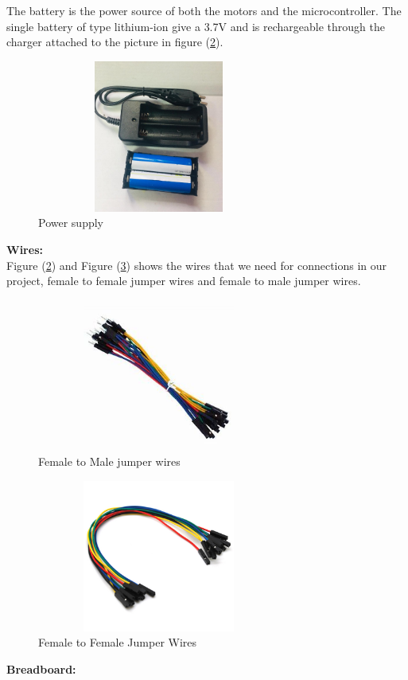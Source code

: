 \documentclass[12pt,a4paper]{report}
\begin{document}
The battery is the power source of both the motors and the microcontroller. The single battery of type lithium-ion give a 3.7V and is rechargeable through the charger attached to the picture in figure (\ref{fig:wires1}).\\

\begin{figure}[H]
    \centering
    \graphicspath{ {./images/} }
    \includegraphics[width=8cm, height=5cm]{power.jpg}
    \caption{Power supply}
    \label{fig:Power}
\end{figure}
\textbf{{Wires:}}\\

Figure (\ref{fig:wires1}) and Figure (\ref{fig:wires2})  shows the wires that we need for connections in our project, female to female jumper wires and female to male jumper wires.

\begin{figure}[H]
    \centering
    \graphicspath{ {./images/} }
    \includegraphics[width=8cm, height=5cm]{FemaletoMalejumperwire.jpg}
    \caption{Female to Male jumper wires}
    \label{fig:wires1}
\end{figure}
\begin{figure}[H]
    \centering
    \graphicspath{ {./images/} }
    \includegraphics[width=8cm, height=5cm]{FemaletoFemaleJumperWires.jpg}
    \caption{Female to Female Jumper Wires}
    \label{fig:wires2}
\end{figure}
\bigskip
\bigskip
\textbf{{ Breadboard:}}\\
\end{document}
